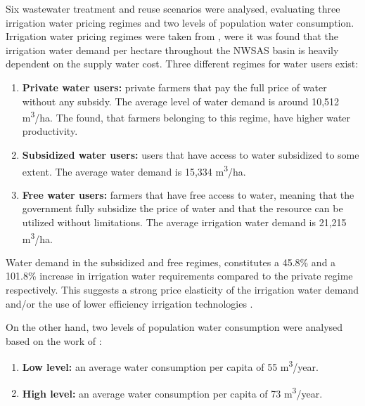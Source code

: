Six wastewater treatment and reuse scenarios were analysed, evaluating three irrigation water pricing regimes and two levels of population water consumption. Irrigation water pricing regimes were taken from \cite{Socioeconomicaspectsirrigation2014}, were it was found that the irrigation water demand per hectare throughout the NWSAS basin is heavily dependent on the supply water cost. Three different regimes for water users exist: 

\begin{enumerate}
	\item \textbf{Private water users:} private farmers that pay the full price of water without any subsidy. The average level of water demand is around 10,512 m\textsuperscript{3}/ha. The \citet{Socioeconomicaspectsirrigation2014} found, that farmers belonging to this regime, have higher water productivity. 
	\item \textbf{Subsidized water users:} users that have access to water subsidized to some extent. The average water demand is 15,334 m\textsuperscript{3}/ha.
	\item \textbf{Free water users:} farmers that have free access to water, meaning that the government fully subsidize the price of water and that the resource can be utilized without limitations. The average irrigation water demand is 21,215 m\textsuperscript{3}/ha.
\end{enumerate}

Water demand in the subsidized and free regimes, constitutes a 45.8\% and a 101.8\% increase in irrigation water requirements compared to the private regime respectively. This suggests a strong price elasticity of the irrigation water demand and/or the use of lower efficiency irrigation technologies \cite{Socioeconomicaspectsirrigation2014}.

On the other hand, two levels of population water consumption were analysed based on the work of \citet{Householdwaterconsumption2014}:

\begin{enumerate}
    \item \textbf{Low level:} an average water consumption per capita of 55 m\textsuperscript{3}/year.
    \item \textbf{High level:} an average water consumption per capita of 73 m\textsuperscript{3}/year.
\end{enumerate}

